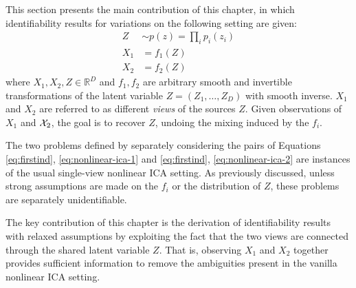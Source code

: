 This section presents the main contribution of this chapter, in which identifiability results for variations on the following setting are given:
\begin{align}
Z &\sim p(z) = \prod_{i} p_i(z_i) \label{eq:firstind}\\
X_1 &= f_1(Z) \label{eq:nonlinear-ica-1}\\
X_2 &= f_2(Z) \label{eq:nonlinear-ica-2}
\end{align}
where $X_1, X_2, Z \in \mathbb{R}^D$ and $f_1, f_2$ are arbitrary smooth and invertible transformations of the latent variable $Z = (Z_1, \ldots, Z_D)$ with smooth inverse.
$X_1$ and $X_2$ are referred to as different \emph{views} of the sources $Z$.
Given observations of $X_1$ and $\mathcal{X}_2$, the goal is to recover $Z$, undoing the mixing induced by the $f_i$.

The two problems defined by separately considering the pairs of Equations \ref{eq:firstind}, \ref{eq:nonlinear-ica-1} and \ref{eq:firstind}, \ref{eq:nonlinear-ica-2} are instances of the usual single-view nonlinear ICA setting.
As previously discussed, unless strong assumptions are made on the $f_i$ or the distribution of $Z$, these problems are separately unidentifiable. 

The key contribution of this chapter is 
the derivation of
identifiability results 
with relaxed assumptions by exploiting the fact that the 
two views are connected through the shared latent variable $Z$. 
That is, observing $X_1$ and $X_2$ together provides sufficient information to remove the ambiguities present in the vanilla nonlinear ICA setting.



